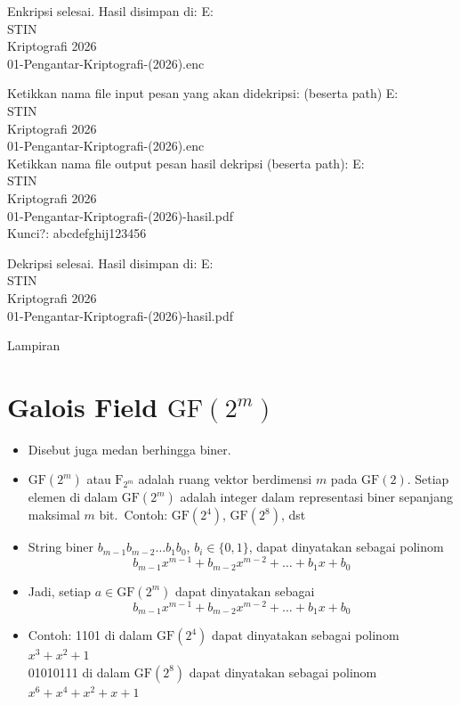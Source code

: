 \documentclass{article}
\begin{document}
Enkripsi selesai. Hasil disimpan di: E:\\STIN\\Kriptografi 2026\\01-Pengantar-Kriptografi-(2026).enc

Ketikkan nama file input pesan yang akan didekripsi: (beserta path) E:\\STIN\\Kriptografi 2026\\01-Pengantar-Kriptografi-(2026).enc\\
Ketikkan nama file output pesan hasil dekripsi (beserta path): E:\\STIN\\Kriptografi 2026\\01-Pengantar-Kriptografi-(2026)-hasil.pdf\\
Kunci?: abcdefghij123456

Dekripsi selesai. Hasil disimpan di: E:\\STIN\\Kriptografi 2026\\01-Pengantar-Kriptografi-(2026)-hasil.pdf

\newpage


Lampiran

\newpage


\section*{Galois Field $\text{GF}(2^m)$}

\begin{itemize}
    \item Disebut juga medan berhingga biner.
    \item $\text{GF}(2^m)$ atau $\text{F}_{2^m}$ adalah ruang vektor berdimensi $m$ pada $\text{GF}(2)$. Setiap elemen di dalam $\text{GF}(2^m)$ adalah integer dalam representasi biner sepanjang maksimal $m$ bit.\
    Contoh: $\text{GF}(2^4)$, $\text{GF}(2^8)$, dst
    \item String biner $b_{m-1}b_{m-2} \dots b_1b_0$, $b_i \in \{0,1\}$, dapat dinyatakan sebagai polinom
    \[ b_{m-1}x^{m-1} + b_{m-2}x^{m-2} + \dots + b_1x + b_0 \]
    \item Jadi, setiap $a \in \text{GF}(2^m)$ dapat dinyatakan sebagai
    \[ b_{m-1}x^{m-1} + b_{m-2}x^{m-2} + \dots + b_1x + b_0 \]
    \item Contoh: 1101 di dalam $\text{GF}(2^4)$ dapat dinyatakan sebagai polinom $x^3 + x^2 + 1$\\
    01010111 di dalam $\text{GF}(2^8)$ dapat dinyatakan sebagai polinom $x^6 + x^4 + x^2 + x + 1$
\end{itemize}
\end{document}
